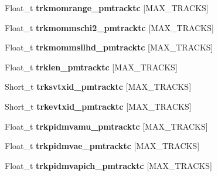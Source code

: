 \begin{DoxyCompactItemize}
\item 
\hypertarget{classanatree_a8176079e5232f7cd94c2801faaa29bc3}{Float\-\_\-t {\bfseries trkmomrange\-\_\-pmtracktc} \mbox{[}M\-A\-X\-\_\-\-T\-R\-A\-C\-K\-S\mbox{]}}\label{classanatree_a8176079e5232f7cd94c2801faaa29bc3}

\item 
\hypertarget{classanatree_a2bf0b888291307a4f5884e22a38dc28f}{Float\-\_\-t {\bfseries trkmommschi2\-\_\-pmtracktc} \mbox{[}M\-A\-X\-\_\-\-T\-R\-A\-C\-K\-S\mbox{]}}\label{classanatree_a2bf0b888291307a4f5884e22a38dc28f}

\item 
\hypertarget{classanatree_a68586b90e0cfa3d2a08990cb05410d20}{Float\-\_\-t {\bfseries trkmommsllhd\-\_\-pmtracktc} \mbox{[}M\-A\-X\-\_\-\-T\-R\-A\-C\-K\-S\mbox{]}}\label{classanatree_a68586b90e0cfa3d2a08990cb05410d20}

\item 
\hypertarget{classanatree_acdc8e9ab5e49db76b1ecbd092d1378eb}{Float\-\_\-t {\bfseries trklen\-\_\-pmtracktc} \mbox{[}M\-A\-X\-\_\-\-T\-R\-A\-C\-K\-S\mbox{]}}\label{classanatree_acdc8e9ab5e49db76b1ecbd092d1378eb}

\item 
\hypertarget{classanatree_ae7c4a4f0fbb6b7a01e50b1747d658fbc}{Short\-\_\-t {\bfseries trksvtxid\-\_\-pmtracktc} \mbox{[}M\-A\-X\-\_\-\-T\-R\-A\-C\-K\-S\mbox{]}}\label{classanatree_ae7c4a4f0fbb6b7a01e50b1747d658fbc}

\item 
\hypertarget{classanatree_a1b338a291e643d9837a16123871007aa}{Short\-\_\-t {\bfseries trkevtxid\-\_\-pmtracktc} \mbox{[}M\-A\-X\-\_\-\-T\-R\-A\-C\-K\-S\mbox{]}}\label{classanatree_a1b338a291e643d9837a16123871007aa}

\item 
\hypertarget{classanatree_a1db8ef1a0e54ce2eb3c3082411a5ac90}{Float\-\_\-t {\bfseries trkpidmvamu\-\_\-pmtracktc} \mbox{[}M\-A\-X\-\_\-\-T\-R\-A\-C\-K\-S\mbox{]}}\label{classanatree_a1db8ef1a0e54ce2eb3c3082411a5ac90}

\item 
\hypertarget{classanatree_a48bc957c9c6188a3989b1d4aa504860d}{Float\-\_\-t {\bfseries trkpidmvae\-\_\-pmtracktc} \mbox{[}M\-A\-X\-\_\-\-T\-R\-A\-C\-K\-S\mbox{]}}\label{classanatree_a48bc957c9c6188a3989b1d4aa504860d}

\item 
\hypertarget{classanatree_a4bff7ec858e1fe70ef59d8cb584ff6fb}{Float\-\_\-t {\bfseries trkpidmvapich\-\_\-pmtracktc} \mbox{[}M\-A\-X\-\_\-\-T\-R\-A\-C\-K\-S\mbox{]}}\label{classanatree_a4bff7ec858e1fe70ef59d8cb584ff6fb}


\end{DoxyCompactItemize}
